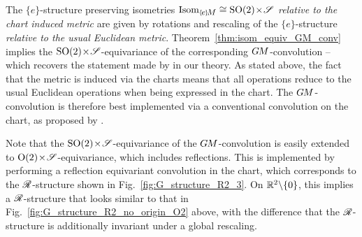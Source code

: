 The $\{e\}$-structure preserving isometries $\IsomeM \cong {\SO2 \!\times\! \Scale}$ \emph{relative to the chart induced metric} are given by rotations and rescaling of the $\{e\}$-structure \emph{relative to the usual Euclidean metric}.
Theorem~\ref{thm:isom_equiv_GM_conv} implies the ${\operatorname{SO}(2) \!\times\! \mathscr{S}}$-equivariance of the corresponding $G\mkern-1.4muM$-convolution -- which recovers the statement made by \citet{esteves2017polar} in our theory.
As stated above, the fact that the metric is induced via the charts means that all operations reduce to the usual Euclidean operations when being expressed in the chart.
The $G\mkern-1.4muM$-convolution is therefore best implemented via a conventional convolution on the chart, as proposed by \citet{esteves2017polar}.


Note that the ${\operatorname{SO}(2) \!\times\! \mathscr{S}}$-equivariance of the $G\mkern-1.4muM$-convolution is easily extended to ${\operatorname{O}(2) \!\times\! \mathscr{S}}$-equivariance, which includes reflections.
This is implemented by performing a reflection equivariant convolution in the chart, which corresponds to the $\mathscr{R}$-structure shown in Fig.~\ref{fig:G_structure_R2_3}.
On $\mathbb{R}^2 \backslash \{0\}$, this implies a $\mathscr{R}$-structure that looks similar to that in Fig.~\ref{fig:G_structure_R2_no_origin_O2} above, with the difference that the $\mathscr{R}$-structure is additionally invariant under a global rescaling.

